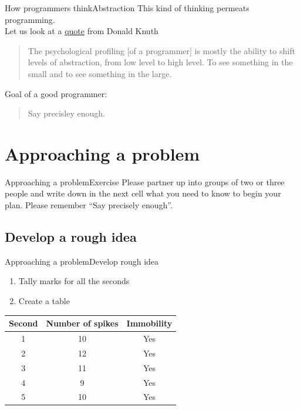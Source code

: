 \documentclass[aspectratio=169]{beamer}
\begin{document}
\begin{frame}{How programmers think}{Abstraction}
This kind of thinking permeats programming. \\

Let us look at a \href{https://en.wikiquote.org/wiki/Donald_Knuth}{quote} from Donald Knuth

\begin{quote}
The psychological profiling [of a programmer] is mostly the ability to shift levels of abstraction,
from low level to high level.
To see something in the small and to see something in the large.
\end{quote}

\pause

Goal of a good programmer:
\begin{quote}
	\centering
	Say precisley enough.
\end{quote}
\end{frame}

\section{Approaching a problem}
\begin{frame}{Approaching a problem}{Exercise}
Please partner up into groups of two or three people and write down in the next cell
what you need to know to begin your plan.
Please remember “Say precisely enough”.
\end{frame}

\subsection{Develop a rough idea}
\begin{frame}{Approaching a problem}{Develop rough idea}
\begin{enumerate}
	\item Tally marks for all the seconds
	\item Create a table
\end{enumerate}

\begin{table}[h]
\center
\begin{tabular}{ccc}
\toprule
Second & Number of spikes & Immobility \\
\midrule
1 & 10 & Yes \\
2 & 12 & Yes \\
3 & 11 & Yes \\
4 & 9 & Yes \\
5 & 10 & Yes \\
\bottomrule
\end{tabular}
\end{table}
\end{frame}
\end{document}
